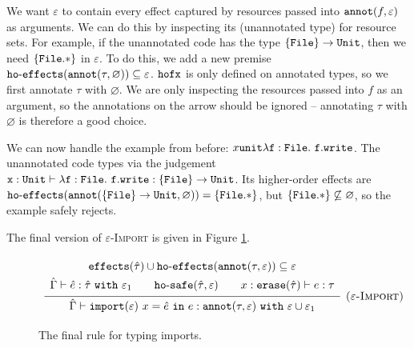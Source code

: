 We want $\varepsilon$ to contain every effect captured by resources passed into $\mathtt{annot}(f, \varepsilon)$ as arguments. We can do this by inspecting its (unannotated type) for resource sets. For example, if the unannotated code has the type $\mathtt{ \{ File \} \rightarrow \mathtt{Unit}}$, then we need $\mathtt{ \{ File.* \} }$ in $\varepsilon$. To do this, we add a new premise $\mathtt{ho \hbox{-} effects}(\mathtt{annot}(\tau, \varnothing)) \subseteq \varepsilon$. $\mathtt{hofx}$ is only defined on annotated types, so we first annotate $\tau$ with $\varnothing$. We are only inspecting the resources passed into $f$ as an argument, so the annotations on the arrow should be ignored -- annotating $\tau$ with $\varnothing$ is therefore a good choice.

We can now handle the example from before: ${x}{\mathtt{unit}}{\mathtt{\lambda f: { File }.~f.write}}$. The unannotated code types via the judgement $\mathtt{x: Unit \vdash \lambda f: { File }.~f.write: \{ File \} \rightarrow Unit}$. Its higher-order effects are $\mathtt{ho \hbox{-} effects}(\mathtt{annot}( \{ \mathtt{File} \} \rightarrow \mathtt{Unit}, \varnothing)) = \{ \mathtt{File.*} \}$, but $\{ \mathtt{File.*} \} \not\subseteq \varnothing$, so the example safely rejects.

The final version of \textsc{$\varepsilon$-Import} is given in Figure \ref{fig:import_rule}.

\begin{figure}[h]

\noindent
{}

\[
\begin{array}{c}

\infer[\textsc{($\varepsilon$-Import)}]
	{ \hat \Gamma \vdash \kwa{import}(\varepsilon)~x = \hat e~\kw{in} e: \kwa{annot}(\tau, \varepsilon)~\kw{with} \varepsilon \cup \varepsilon_1 }
{{\def\arraystretch{1.4}
  \begin{array}{c}
\kwa{effects}(\hat \tau) \cup \hofx{\annot{\tau}{\varepsilon}}\subseteq \varepsilon \\
\hat \Gamma \vdash \hat e: \hat \tau~\kw{with} \varepsilon_1 ~~~~~~ \kwa{ho \hyphen safe}(\hat \tau, \varepsilon) ~~~~~~ x: \kwa{erase}(\hat \tau) \vdash e: \tau
  \end{array}}} 
 
\end{array}
\]


\vspace{-7pt}
\caption{The final rule for typing imports.}
\label{fig:import_rule}
\end{figure}

